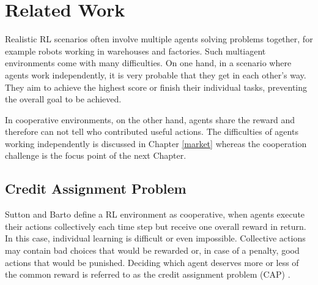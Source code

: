 %
%
\chapter{Related Work}\label{sec:RelatedWork}
Realistic RL scenarios often involve multiple agents solving problems together, for example robots working in warehouses and factories. Such multiagent environments come with many difficulties. On one hand, in a scenario where agents work independently, it is very probable that they get in each other's way. They aim to achieve the highest score or finish their individual tasks, preventing the overall goal to be achieved.

In cooperative environments, on the other hand, agents share the reward and therefore can not tell who contributed useful actions. 
The difficulties of agents working independently is discussed in Chapter \ref{market} whereas the cooperation challenge is the focus point of the next Chapter.

\section{Credit Assignment Problem}\label{CAP}
Sutton and Barto \cite{suba18} define a RL environment as cooperative, when agents execute their actions collectively each time step but receive one overall reward in return. In this case, individual learning is difficult or even impossible. Collective actions may contain bad choices that would be rewarded or, in case of a penalty, good actions that would be punished. Deciding which agent deserves more or less of the common reward is referred to as the credit assignment problem (CAP) \cite{mi61}.

